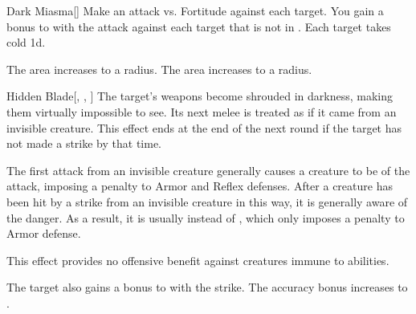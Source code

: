 \lowercase{\hypertarget{spell:Dark Miasma}{}}\label{spell:Dark Miasma}
\begin{freeability}[Rank 3]{\hypertarget{spell:Dark Miasma}{Dark Miasma}}[]
Make an attack vs. Fortitude against each target.
You gain a  bonus to  with the attack against each target that is not in .
\hit Each target takes cold  \minus1d.

\rankline
{} The area increases to a \areamed radius.
 The area increases to a \arealarge radius.
\end{freeability}
\vspace{0.25em}



\lowercase{\hypertarget{spell:Hidden Blade}{}}\label{spell:Hidden Blade}
\begin{freeability}[Rank 3]{\hypertarget{spell:Hidden Blade}{Hidden Blade}}[, , ]
The target's weapons become shrouded in darkness, making them virtually impossible to see.
Its next melee  is treated as if it came from an invisible creature.
This effect ends at the end of the next round if the target has not made a strike by that time.

The first attack from an invisible creature generally causes a creature to be  of the attack, imposing a  penalty to Armor and Reflex defenses.
After a creature has been hit by a strike from an invisible creature in this way, it is generally aware of the danger.
As a result, it is usually  instead of , which only imposes a  penalty to Armor defense.

This effect provides no offensive benefit against creatures immune to  abilities.

\rankline
{} The target also gains a  bonus to  with the strike.
 The accuracy bonus increases to .
\end{freeability}
\vspace{0.25em}



